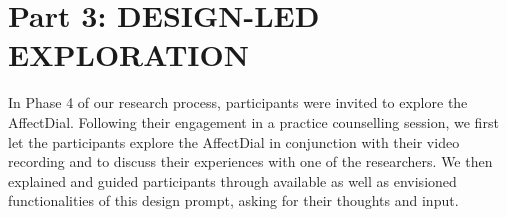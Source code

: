 \documentclass{sigchi}
\begin{document}
\enlargethispage{\baselineskip}
\section{Part 3: DESIGN-LED EXPLORATION}
\label{sec:Probe}
In Phase 4 of our research process, participants were invited to explore the AffectDial. Following their engagement in a practice counselling session, we first let the participants explore the AffectDial in conjunction with their video recording and to discuss their experiences with one of the researchers. We then explained and guided participants through available as well as envisioned functionalities of this design prompt, asking for their thoughts and input. 


%
%
%
\end{document}
